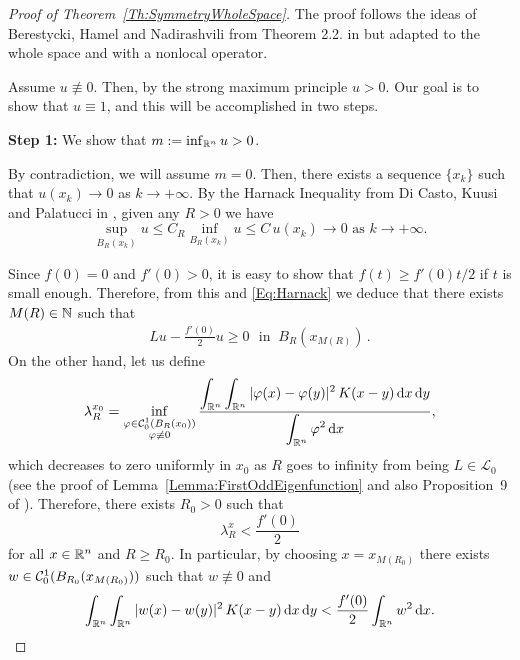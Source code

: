 \begin{proof}[Proof of Theorem~\ref{Th:SymmetryWholeSpace}]
The proof follows the ideas of Berestycki, Hamel and Nadirashvili from Theorem 2.2. in \cite{BerestyckiHamelNadi} but adapted to the whole space and with a nonlocal operator.

Assume $u\not\equiv 0$. Then, by the strong maximum principle $u>0$. Our goal is to show that $u \equiv 1$, and this will be accomplished in two steps.

\textbf{Step 1:} We show that $m:=\inf_{\mathbb{R}^n} u >0$.

By contradiction, we will assume $m=0$. Then, there exists a sequence $\{x_k\}$ such that $u(x_k)\rightarrow 0$ as $k \rightarrow +\infty$. By the Harnack Inequality  from Di Casto, Kuusi and Palatucci in \cite{DiCastoKuusiPalatucci}, given any $R>0$ we have
\begin{equation}
\label{Eq:Harnack}
\sup_{B_R(x_k)}u \leq C_R \inf_{B_R(x_k)}u \leq C \, u(x_k) \rightarrow 0 \,\,\text{as}\,\, k\rightarrow +\infty.
\end{equation}


Since $f(0) = 0 $ and $f'(0)>0$, it is easy to show that $f(t)\geq f'(0)t/2$ if $t$ is small enough. Therefore, from this and \eqref{Eq:Harnack}  we deduce that there exists $M(R)\in\mathbb{N}$ such that
\begin{align}
\label{Eq:WholeSpace2}
L u - \frac{f'(0)}{2}u \geq 0 \,\,\textrm{ in }\ B_R(x_{M(R)})\,. 
\end{align}
On the other hand, let us define
$$ \lambda_R^{x_0} = \inf_{\substack{\varphi\in\mathcal{C}^{1}_{0}(B_R(x_0))\\ \varphi\not\equiv 0}} \frac{\displaystyle \int_{\mathbb{R}^n}\int_{\mathbb{R}^n}|\varphi(x)-\varphi(y)|^2\,K(x-y) \,\mathrm{d} x \,\mathrm{d} y}{\displaystyle \int_{\mathbb{R}^n}\varphi^2 \,\mathrm{d} x}, $$
which decreases to zero uniformly in $x_0$ as $R$ goes to infinity from being $L\in\mathcal{L}_0$ (see the proof of Lemma~\ref{Lemma:FirstOddEigenfunction} and also Proposition~9 of \cite{ServadeiValdinoci}). Therefore, there exists $R_0>0$ such that
$$ \lambda_R^x < \frac{f'(0)}{2} $$
for all $x\in \mathbb{R}^n$ and $R\geq R_0$. In particular, by choosing $x=x_{M(R_0)}$ there exists $w\in\mathcal{C}^{1}_0(B_{R_0}(x_{M(R_0)}))$ such that $w\not\equiv 0$ and
\begin{equation}
\label{Eq:Eigenfunction}
\int_{\mathbb{R}^n}\int_{\mathbb{R}^n}|w(x)-w(y)|^2\,K(x-y) \,\mathrm{d} x \,\mathrm{d} y < \frac{f'(0)}{2}\int_{\mathbb{R}^n}w^2 \,\mathrm{d} x.
\end{equation}


\end{proof}
